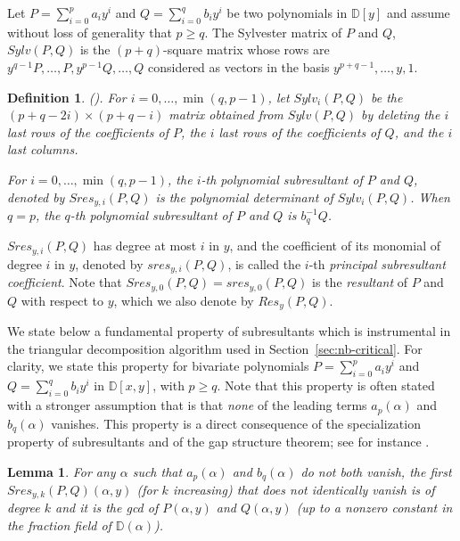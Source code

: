 \documentclass{sig-alternate}
\newtheorem{definition}[theorem]{Definition}
\newtheorem{lemma}[theorem]{Lemma}
\newcommand {\D}   {\mathbb D}
\begin{document}
Let $P =\sum_{i=0}^p a_i y^i$ and $Q= \sum_{i = 0}^q b_i y^i$ be two polynomials
in $\D[y]$ and assume without loss of generality that $p \geq q$. The Sylvester
matrix of $P$ and $Q$, $Sylv(P,Q)$ is the $(p+q)$-square matrix whose rows are
$y^{q-1}P,\ldots,P,y^{p-1}Q,\ldots,Q$ considered as vectors in the basis
$y^{p+q-1},\ldots,y,1$. 


\begin{definition}\label{def:sub-resultant}(\cite[\S 3]{Kahoui03}). 
  For $i=0,\ldots, \min(q,p-1)$, let $Sylv_i(P,Q)$ be the $(p+q-2i)\times
  (p+q-i)$ matrix obtained from $Sylv(P,Q)$ by deleting the $i$ last rows of the
  coefficients of $P$, the $i$ last rows of the coefficients of $Q$, and the $i$
  last columns.
 
  For $i=0,\ldots, \min(q,p-1)$, the $i$-th polynomial subresultant of $P$ and
  $Q$, denoted by $Sres_{y,i}(P,Q)$ is the polynomial determinant of
  $Sylv_i(P,Q)$.  When $q=p$, the $q$-th polynomial subresultant of $P$ and $Q$
  is $b_q^{-1}Q$.\end{definition}


$Sres_{y,i}(P,Q)$ has degree at most $i$ in $y$, and the coefficient of its
monomial of degree $i$ in $y$, denoted by ${sres}_{y,i} (P, Q)$, is called the
$i$-th \emph{principal subresultant coefficient}.  Note that ${Sres}_{y,0} (P,
Q)={sres}_{y,0} (P, Q)$ is the \emph{resultant} of $P$ and $Q$ with respect to
$y$, which we also denote by $Res_y(P,Q)$.  





\smallskip
We state below a fundamental property of subresultants which is instrumental in
the triangular decomposition algorithm used in Section~\ref{sec:nb-critical}. For
clarity, we state this property for bivariate polynomials $P =\sum_{i=0}^p a_i
y^i$ and $Q= \sum_{i = 0}^q b_i y^i$ in $\D[x,y]$, with $p\geq q$.
Note that this property is often stated with a stronger assumption that is that
\emph{none} of the leading terms $a_p(\alpha)$ and $b_q(\alpha)$ vanishes.  This
property is a direct consequence of the specialization property of subresultants
and of the gap structure theorem; see for instance \cite[Lemmas 2.3, 3.1 and
Cor. 5.1]{Kahoui03}.

\begin{lemma}\label{lem:fund-prop-subres}
  For any $\alpha$ such that $a_p(\alpha)$ and $b_q(\alpha)$ do not both vanish,
  the first ${Sres}_{y,k}(P,Q)(\alpha,y)$ (for $k$ increasing) that does not
  identically vanish is of degree $k$ and it is the gcd of $P(\alpha,y)$ and
  $Q(\alpha,y)$ (up to a nonzero constant in the fraction field of
  $\D(\alpha)$).
\end{lemma}
\end{document}
